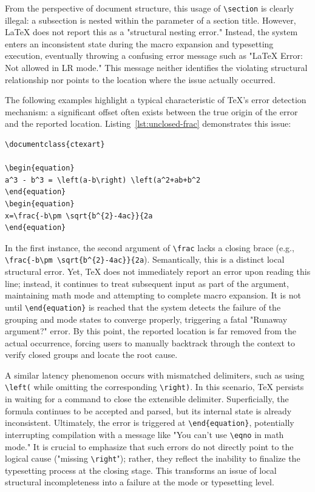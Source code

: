 From the perspective of document structure, this usage of \texttt{\textbackslash section} is clearly illegal: a subsection is nested within the parameter of a section title. However, \LaTeX{} does not report this as a "structural nesting error." Instead, the system enters an inconsistent state during the macro expansion and typesetting execution, eventually throwing a confusing error message such as "LaTeX Error: Not allowed in LR mode." This message neither identifies the violating structural relationship nor points to the location where the issue actually occurred.

The following examples highlight a typical characteristic of \TeX{}'s error detection mechanism: a significant offset often exists between the true origin of the error and the reported location. Listing~\ref{lst:unclosed-frac} demonstrates this issue:

\begin{lstlisting}[caption={Unclosed brace in frac},label={lst:unclosed-frac}]
\documentclass{ctexart}

\begin{equation}
a^3 - b^3 = \left(a-b\right) \left(a^2+ab+b^2
\end{equation}
\begin{equation}
x=\frac{-b\pm \sqrt{b^{2}-4ac}}{2a
\end{equation}

\end{lstlisting}

In the first instance, the second argument of \texttt{\textbackslash frac} lacks a closing brace (e.g., \verb|\frac{-b\pm \sqrt{b^{2}-4ac}}{2a|). Semantically, this is a distinct local structural error. Yet, \TeX{} does not immediately report an error upon reading this line; instead, it continues to treat subsequent input as part of the argument, maintaining math mode and attempting to complete macro expansion. It is not until \texttt{\textbackslash end\{equation\}} is reached that the system detects the failure of the grouping and mode states to converge properly, triggering a fatal "Runaway argument?" error. By this point, the reported location is far removed from the actual occurrence, forcing users to manually backtrack through the context to verify closed groups and locate the root cause.

A similar latency phenomenon occurs with mismatched delimiters, such as using \texttt{\textbackslash left(} while omitting the corresponding \texttt{\textbackslash right)}. In this scenario, \TeX{} persists in waiting for a command to close the extensible delimiter. Superficially, the formula continues to be accepted and parsed, but its internal state is already inconsistent. Ultimately, the error is triggered at \texttt{\textbackslash end\{equation\}}, potentially interrupting compilation with a message like "You can't use \texttt{\textbackslash eqno} in math mode." It is crucial to emphasize that such errors do not directly point to the logical cause ("missing \texttt{\textbackslash right}"); rather, they reflect the inability to finalize the typesetting process at the closing stage. This transforms an issue of local structural incompleteness into a failure at the mode or typesetting level.

